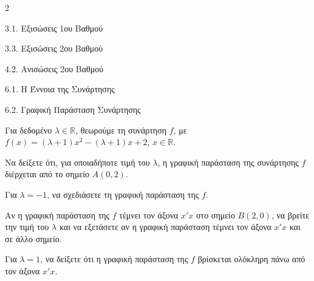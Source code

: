 \begin{ylh}{2}
    \item 3.1. Εξισώσεις 1ου Βαθμού
    \item 3.3. Εξισώσεις 2ου Βαθμού
    \item 4.2. Ανισώσεις 2ου Βαθμού
    \item 6.1. Η Έννοια της Συνάρτησης
    \item 6.2. Γραφική Παράσταση Συνάρτησης
\end{ylh}
Για δεδομένο $\lambda \in \mathbb{R}$, θεωρούμε τη συνάρτηση $f$, με
$f(x) = (\lambda + 1)x^2 - (\lambda + 1)x + 2$, $x \in \mathbb{R}$.
\begin{alist}
\item Να δείξετε ότι, για οποιαδήποτε τιμή του $\lambda$, η γραφική παράσταση της συνάρτησης $f$ διέρχεται από το σημείο ${A}(0, 2)$.
\item Για $\lambda = -1$, να σχεδιάσετε τη γραφική παράσταση της $f$.
\item Αν η γραφική παράσταση της $f$ τέμνει τον άξονα $x'x$ στο σημείο ${B}(2, 0)$, να βρείτε την τιμή του $\lambda$ και να εξετάσετε αν η γραφική παράσταση τέμνει τον άξονα $x'x$ και σε άλλο σημείο.
\item Για $\lambda = 1$, να δείξετε ότι η γραφική παράσταση της $f$ βρίσκεται ολόκληρη πάνω από τον άξονα $x'x$.

\end{alist}

